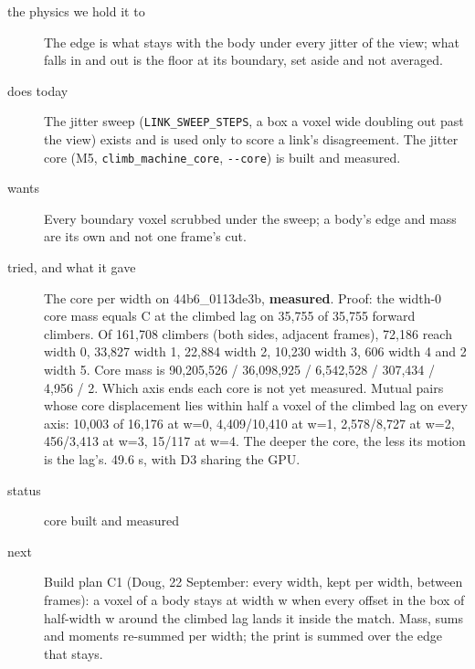 \begin{description}
\item[{the physics we hold it to}] The edge is what stays with the body under every jitter of the view; what falls in and out is the floor at its boundary, set aside and not averaged.
\item[{does today}] The jitter sweep (\texttt{LINK\_\allowbreak{}SWEEP\_\allowbreak{}STEPS}, a box a voxel wide doubling out past the view) exists and is used only to score a link's disagreement. The jitter core (M5, \texttt{climb\_\allowbreak{}machine\_\allowbreak{}core}, \texttt{-\allowbreak{}-\allowbreak{}core}) is built and measured.
\item[{wants}] Every boundary voxel scrubbed under the sweep; a body's edge and mass are its own and not one frame's cut.
\item[{tried, and what it gave}] The core per width on 44b6\_\allowbreak{}0113de3b, \textbf{measured}. Proof: the width-0 core mass equals C at the climbed lag on 35,755 of 35,755 forward climbers. Of 161,708 climbers (both sides, adjacent frames), 72,186 reach width 0, 33,827 width 1, 22,884 width 2, 10,230 width 3, 606 width 4 and 2 width 5. Core mass is 90,205,526 / 36,098,925 / 6,542,528 / 307,434 / 4,956 / 2. Which axis ends each core is not yet measured. Mutual pairs whose core displacement lies within half a voxel of the climbed lag on every axis: 10,003 of 16,176 at w=0, 4,409/10,410 at w=1, 2,578/8,727 at w=2, 456/3,413 at w=3, 15/117 at w=4. The deeper the core, the less its motion is the lag's. 49.6 s, with D3 sharing the GPU.
\item[{status}] core built and measured
\item[{next}] Build plan C1 (Doug, 22 September: every width, kept per width, between frames): a voxel of a body stays at width w when every offset in the box of half-width w around the climbed lag lands it inside the match. Mass, sums and moments re-summed per width; the print is summed over the edge that stays.
\end{description}


